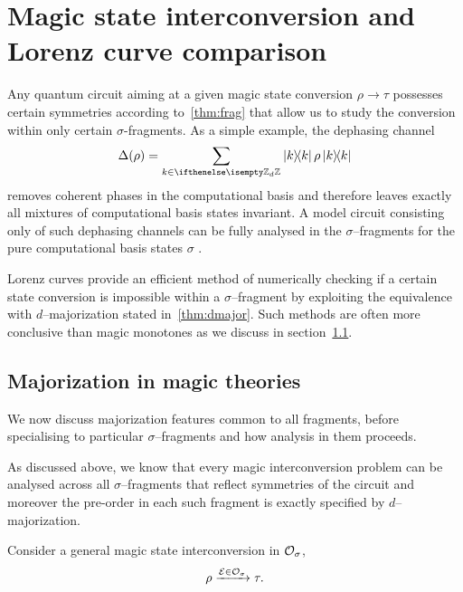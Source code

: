 \documentclass[pra,
aps,
twocolumn,
superscriptaddress,
groupedaddress,
nofootinbib,
reprint
]{revtex4-1}
\begin{document}
 


\section{Magic state interconversion and Lorenz curve comparison}
\label{sec:distill}

Any quantum circuit aiming at a given magic state conversion $\rho \longrightarrow \tau$ possesses certain symmetries according to~\cref{thm:frag} that allow us to study the conversion within only certain $\sigma$-fragments.
As a simple example, the dephasing channel
\begin{equation}\label{eq:dephase}
	\Delta(\rho) = \sum_{k \in \zd} \ketbra{k}{k}\rho\ketbra{k}{k}
\end{equation}
removes coherent phases in the computational basis and therefore leaves exactly all mixtures of computational basis states invariant.
A model circuit consisting only of such dephasing channels can be fully analysed in the $\sigma$--fragments for the pure computational basis states $\sigma$ .

Lorenz curves provide an efficient method of numerically checking if a certain state conversion is impossible within a $\sigma$--fragment by exploiting the equivalence with $d$--majorization stated in~\cref{thm:dmajor}.
Such methods are often more conclusive than magic monotones as we discuss in section~\cref{sec:scmana}.

\subsection{Majorization in magic theories}\label{sec:scmana}
We now discuss majorization features common to all fragments, before specialising to particular $\sigma$--fragments and how analysis in them proceeds.

As discussed above, we know that every magic interconversion problem can be analysed across all $\sigma$--fragments that reflect symmetries of the circuit and moreover the pre-order in each such fragment is exactly specified by $d$--majorization.

Consider a general magic state interconversion in $\mathcal{O}_\sigma$, 
\begin{equation}
	\rho \xrightarrow{\mathcal{E} \in \mathcal{O}_\sigma} \tau.
\end{equation}
\end{document}
